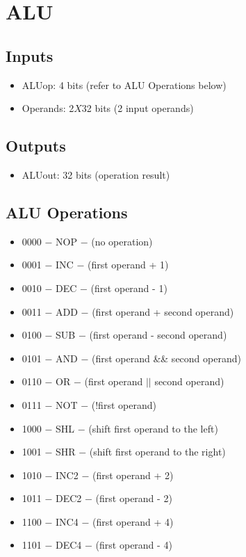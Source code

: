 \documentclass[12pt]{report}
\begin{document}
\section{ALU}

\subsection{Inputs}
\begin{itemize}
    \item ALUop: 4 bits (refer to ALU Operations below)
    \item Operands: 2$X$32 bits (2 input operands)
\end{itemize}

\subsection{Outputs}
\begin{itemize}
    \item ALUout: 32 bits (operation result)
\end{itemize}

\subsection{ALU Operations}
\begin{itemize}
    \item 0000 $-$ NOP $-$ (no operation)
    \item 0001 $-$ INC $-$ (first operand + 1)
    \item 0010 $-$ DEC $-$ (first operand - 1)
    \item 0011 $-$ ADD $-$ (first operand + second operand)
    \item 0100 $-$ SUB $-$ (first operand - second operand)
    \item 0101 $-$ AND $-$ (first operand \&\& second operand)
    \item 0110 $-$ OR $-$ (first operand $||$ second operand)
    \item 0111 $-$ NOT $-$ (!first operand)
    \item 1000 $-$ SHL $-$ (shift first operand to the left)
    \item 1001 $-$ SHR $-$ (shift first operand to the right)
    \item 1010 $-$ INC2 $-$ (first operand + 2)
    \item 1011 $-$ DEC2 $-$ (first operand - 2)
    \item 1100 $-$ INC4 $-$ (first operand + 4)
    \item 1101 $-$ DEC4 $-$ (first operand - 4)
\end{itemize}
\end{document}
